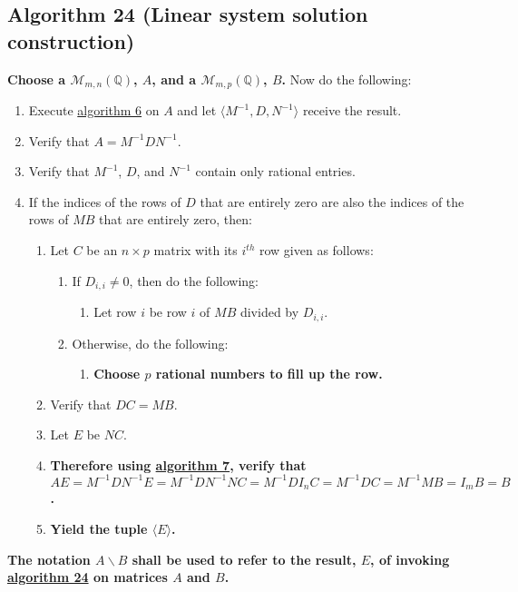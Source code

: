 \documentclass[twocolumn]{article}
\begin{document}
		\subsection{Algorithm 24 (Linear system solution construction)}\label{sec:algorithm 24}
			\textbf{Choose a $\mathcal{M}_{m,n}(\mathbb{Q})$, $A$, and a $\mathcal{M}_{m,p}(\mathbb{Q})$, $B$.} Now do the following:
			\begin{enumerate}
				\item Execute \hyperref[sec:algorithm 6]{algorithm 6} on $A$ and let $\langle M^{-1},D,N^{-1}\rangle$ receive the result.
				\item Verify that $A=M^{-1}DN^{-1}$.
				\item Verify that $M^{-1}$, $D$, and $N^{-1}$ contain only rational entries.
				\item If the indices of the rows of $D$ that are entirely zero are also the indices of the rows of $MB$ that are entirely zero, then:
				\begin{enumerate}
					\item Let $C$ be an $n\times p$ matrix with its $i^{th}$ row given as follows:
					\begin{enumerate}
						\item If $D_{i,i}\ne 0$, then do the following:
						\begin{enumerate}
							\item Let row $i$ be row $i$ of $MB$ divided by $D_{i,i}$.
						\end{enumerate}
						\item Otherwise, do the following:
						\begin{enumerate}
							\item \textbf{Choose $p$ rational numbers to fill up the row.}
						\end{enumerate}
					\end{enumerate}
					\item Verify that $DC=MB$.
					\item Let $E$ be $NC$.
					\item \textbf{Therefore using \hyperref[sec:algorithm 7]{algorithm 7}, verify that $AE=M^{-1}DN^{-1}E=M^{-1}DN^{-1}NC=M^{-1}DI_nC=M^{-1}DC=M^{-1}MB=I_mB=B$.}
					\item \textbf{Yield the tuple $\langle E\rangle$.}
				\end{enumerate} 
			\end{enumerate}
			\textbf{The notation $A\backslash B$ shall be used to refer to the result, $E$, of invoking \hyperref[sec:algorithm 24]{algorithm 24} on matrices $A$ and $B$.}
			
\end{document}
